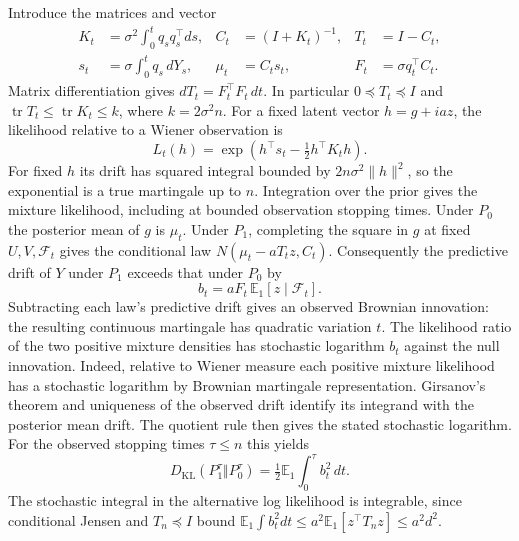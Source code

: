 Introduce the matrices and vector
\begin{align*}
 K_t&=\sigma^2\int_0^t q_s q_s^\top ds,&
 C_t&=(I+K_t)^{-1},& T_t&=I-C_t,\\
 s_t&=\sigma\int_0^t q_s\,dY_s,&
 \mu_t&=C_t s_t,& F_t&=\sigma q_t^\top C_t .
\end{align*}
Matrix differentiation gives \(dT_t=F_t^\top F_t\,dt\).
In particular \(0\preceq T_t\preceq I\) and
\(\operatorname{tr}T_t\le\operatorname{tr}K_t\le k\), where
\(k=2\sigma^2n\). For a fixed latent vector \(h=g+i a z\), the
likelihood relative to a Wiener observation is
\[
 L_t(h)=\exp(h^\top s_t-\tfrac12 h^\top K_t h).
\]
For fixed \(h\) its drift has squared integral bounded by
\(2n\sigma^2\|h\|^2\), so the exponential is a true martingale up to \(n\).
Integration over the prior gives the mixture likelihood, including at
bounded observation stopping times. Under \(P_0\) the posterior mean of
\(g\) is \(\mu_t\). Under \(P_1\), completing the square in \(g\)
at fixed \(U,V,\mathcal F_t\) gives the conditional law
\(N(\mu_t-aT_t z,C_t)\). Consequently the predictive drift of \(Y\)
under \(P_1\) exceeds that under \(P_0\) by
\begin{equation}\label{eq:disc-drift}
 b_t=aF_t\,\mathbb E_1[z\mid\mathcal F_t].
\end{equation}
Subtracting each law's predictive drift gives an observed Brownian
innovation: the resulting continuous martingale has quadratic variation \(t\).
The likelihood ratio of the two positive mixture densities has stochastic
logarithm \(b_t\) against the null innovation. Indeed, relative to Wiener measure each positive mixture likelihood has a stochastic logarithm by Brownian martingale representation. Girsanov's theorem and uniqueness of the observed drift identify its integrand with the posterior mean drift. The quotient rule then gives the stated stochastic logarithm.
For the observed stopping times \(\tau\le n\) this yields
\begin{equation}\label{eq:disc-KL}
 D_{\mathrm{KL}}(P_1^\tau\Vert P_0^\tau)
   =\tfrac12\mathbb E_1\int_0^\tau b_t^2\,dt .
\end{equation}
The stochastic integral in the alternative log likelihood is integrable,
since conditional Jensen and \(T_n\preceq I\) bound
\(\mathbb E_1\int b_t^2dt\le a^2\mathbb E_1[z^\top T_nz]
\le a^2d^2\).

